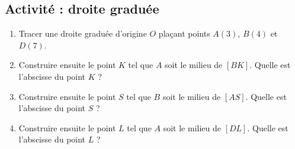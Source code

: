 
\subsection*{Activité : droite graduée}

\begin{enumerate}
    \item
        Tracer une droite graduée d'origine \( O\) plaçant points \( A(3)\), \( B(4)\) et \( D(7)\). 

\begin{center}

\end{center}

    \item
        Construire ensuite le point \( K\) tel que \( A\) soit le milieu de \( [BK]\). Quelle est l'abscisse du point \( K \) ?
    \item
        Construire ensuite le point \( S\) tel que \( B\) soit le milieu de \( [AS]\). Quelle est l'abscisse du point \( S \) ?
    \item
        Construire ensuite le point \( L\) tel que \( A\) soit le milieu de \( [DL]\). Quelle est l'abscisse du point \( L \) ?
\end{enumerate}
